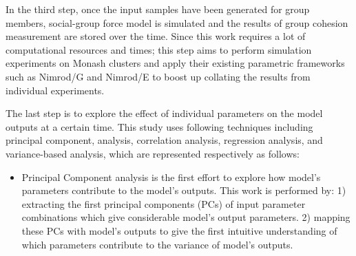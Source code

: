 \documentclass[a4paper,11pt,phdthesis,singlespace,twoside]{cssethesis}
\begin{document}
In the third step, once the input samples have been generated for group members, social-group force model is simulated and the results of group cohesion measurement are stored over the time. Since this work requires a lot of computational resources and times; this step aims to perform simulation experiments on Monash clusters and apply their existing parametric frameworks such as Nimrod/G and Nimrod/E \cite{Abramson2011} to boost up collating the results from individual experiments.

The last step is to explore the effect of individual parameters on the model outputs at a certain time. This study uses following techniques including principal component, analysis, correlation analysis, regression analysis, and variance-based analysis, which are represented respectively as follows:
\begin{itemize}
	\item Principal Component analysis is the first effort to explore how model's parameters contribute to the model's outputs. This work is performed by: 1) extracting the first principal components (PCs) of input parameter combinations which give considerable model's output parameters. 2) mapping these PCs with model's outputs to give the first intuitive understanding of which parameters contribute to the variance of model's outputs.
		

\end{itemize}
\end{document}
